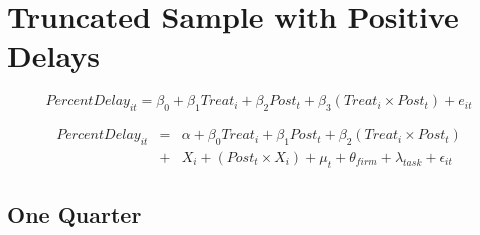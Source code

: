 \documentclass[
]{article}
\begin{document}
\hypertarget{truncated-sample-with-positive-delays}{%
\section{Truncated Sample with Positive
Delays}\label{truncated-sample-with-positive-delays}}

\[ PercentDelay_{it} = \beta_0 + \beta_1 Treat_i + \beta_2 Post_t + \beta_3 (Treat_i \times Post_t) + e_{it}\]

\[ \begin{aligned} PercentDelay_{it} &=& \alpha+\beta_0 Treat_i + \beta_1 Post_t + \beta_2 (Treat_i \times Post_t)\\
&+&  X_i + (Post_t \times X_i) + \mu_t + \theta_{firm} + \lambda_{task}+ \epsilon_{it}
\end{aligned}\]

\hypertarget{one-quarter-1}{%
\subsection{One Quarter}\label{one-quarter-1}}
\end{document}
